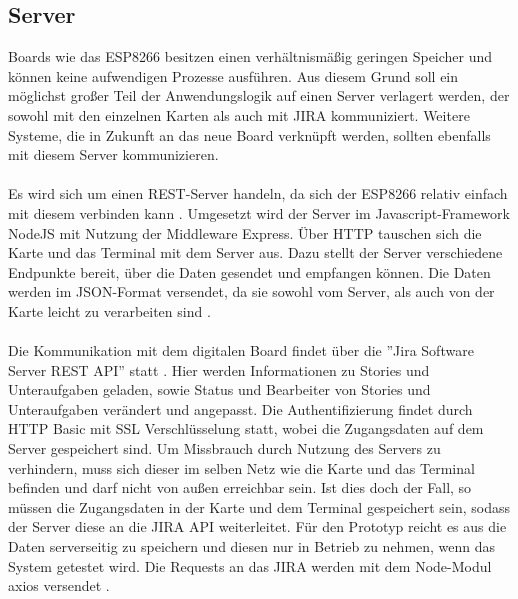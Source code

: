 \documentclass[12pt,titlepage]{scrartcl}
\begin{document}
		\subsection{Server} \label{techserver}
		Boards wie das ESP8266 besitzen einen verhältnismäßig geringen Speicher und können keine aufwendigen Prozesse ausführen. Aus diesem Grund soll ein möglichst großer Teil der Anwendungslogik auf einen Server verlagert werden, der sowohl mit den einzelnen Karten als auch mit JIRA kommuniziert. Weitere Systeme, die in Zukunft an das neue Board verknüpft werden, sollten ebenfalls mit diesem Server kommunizieren. \\ \\
		Es wird sich um einen REST-Server handeln, da sich der ESP8266 relativ einfach mit diesem verbinden kann \cite{nodemcuexamples}. Umgesetzt wird der Server im Javascript-Framework NodeJS mit Nutzung der Middleware Express. Über HTTP tauschen sich die Karte und das Terminal mit dem Server aus. Dazu stellt der Server verschiedene Endpunkte bereit, über die Daten gesendet und empfangen können. Die Daten werden im JSON-Format versendet, da sie sowohl vom Server, als auch von der Karte leicht zu verarbeiten sind \cite{arduinojson}. \\ \\
		Die Kommunikation mit dem digitalen Board findet über die ''Jira Software Server REST API'' statt \cite{jiraapi}. Hier werden Informationen zu Stories und Unteraufgaben geladen, sowie Status und Bearbeiter von Stories und Unteraufgaben verändert und angepasst. Die Authentifizierung findet durch HTTP Basic mit SSL Verschlüsselung statt, wobei die Zugangsdaten auf dem Server gespeichert sind. Um Missbrauch durch Nutzung des Servers zu verhindern, muss sich dieser im selben Netz wie die Karte und das Terminal befinden und darf nicht von außen erreichbar sein. Ist dies doch der Fall, so müssen die Zugangsdaten in der Karte und dem Terminal gespeichert sein, sodass der Server diese an die JIRA API weiterleitet. Für den Prototyp reicht es aus die Daten serverseitig zu speichern und diesen nur in Betrieb zu nehmen, wenn das System getestet wird. Die Requests an das JIRA werden mit dem Node-Modul axios versendet \cite{npmaxios}.
\end{document}
